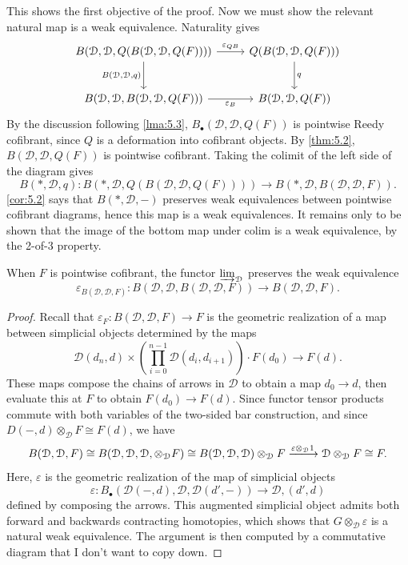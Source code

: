 This shows the first objective of the proof. Now we must show the relevant natural map is a weak equivalence. Naturality gives
\[\begin{tikzcd}[row sep = 2.5em, column sep = 2.5em]
B(\mathcal{D} ,\mathcal{D} ,Q(B(\mathcal{D} ,\mathcal{D} ,Q(F))))\ar[" \varepsilon_{QB}  ", r] \ar[" B(\mathcal{D} \text{,} \mathcal{D} \text{,} q) "', d]  & Q(B(\mathcal{D} ,\mathcal{D} ,Q(F)))\ar[" q ", d]  \\
B(\mathcal{D} ,\mathcal{D} ,B(\mathcal{D} ,\mathcal{D} ,Q(F)))\ar[" \varepsilon _B "', r]  & B(\mathcal{D} ,\mathcal{D} ,Q(F))
\end{tikzcd}\]
By the discussion following \cref{lma:5.3}, $B_{\bullet} (\mathcal{D} ,\mathcal{D} ,Q(F))$ is pointwise Reedy cofibrant, since $Q$ is a deformation into cofibrant objects. By \cref{thm:5.2}, $B(\mathcal{D} ,\mathcal{D} ,Q(F))$ is pointwise cofibrant. Taking the colimit of the left side of the diagram gives
\[
	B(*,\mathcal{D},q): B(*,\mathcal{D} ,Q(B(\mathcal{D} ,\mathcal{D} ,Q(F)))) \to B(*,\mathcal{D} ,B(\mathcal{D} ,\mathcal{D} ,F))
.\]
\cref{cor:5.2} says that $B(*,\mathcal{D} ,-)$ preserves weak equivalences between pointwise cofibrant diagrams, hence this map is a weak equivalences. It remains only to be shown that the image of the bottom map under colim is a weak equivalence, by the 2-of-3 property.
\begin{lemma}\label{lma:5.4}
	When $F$ is pointwise cofibrant, the functor $\varinjlim _\mathcal{D} $ preserves the weak equivalence
	\[
		\varepsilon_{B(\mathcal{D} ,\mathcal{D} ,F)} : B(\mathcal{D} ,\mathcal{D} ,B(\mathcal{D} ,\mathcal{D} ,F)) \to B(\mathcal{D} ,\mathcal{D} ,F)
	.\]	
\end{lemma}
\begin{proof}
	Recall that $\varepsilon_F : B(\mathcal{D} ,\mathcal{D} ,F) \to F$ is the geometric realization of a map between simplicial objects determined by the maps
	\[
		\mathcal{D} (d_n,d)\times \left( \prod_{i=0}^{n-1} \mathcal{D} (d_i,d_{i+1} )\right)\cdot F(d_0)\to F(d)
	.\]
	These maps compose the chains of arrows in $\mathcal{D} $ to obtain a map $d_0\to d$, then evaluate this at $F$ to obtain $F(d_0)\to F(d)$. Since functor tensor products commute with both variables of the two-sided bar construction, and since $D(-,d)\otimes _\mathcal{D} F\cong F(d)$, we have
	\[
	B(\mathcal{D} ,\mathcal{D} ,F)\cong B(\mathcal{D} ,\mathcal{D} ,\mathcal{D} ,\otimes _\mathcal{D} F)\cong B(\mathcal{D} ,\mathcal{D} ,\mathcal{D} )\otimes _\mathcal{D} F\xlongrightarrow{\varepsilon \otimes _\mathcal{D} 1} \mathcal{D} \otimes _\mathcal{D} F\cong F
	.\]
	Here, $\varepsilon $ is the geometric realization of the map of simplicial objects
	\[
		\varepsilon : B_{\bullet} (\mathcal{D} (-,d),\mathcal{D} ,\mathcal{D} (d',-)) \to \mathcal{D} ,(d',d)
	\]
	defined by composing the arrows. This augmented simplicial object admits both forward and backwards contracting homotopies, which shows that $G\otimes _\mathcal{D} \varepsilon $ is a natural weak equivalence. The argument is then computed by a commutative diagram that I don't want to copy down.
\end{proof}

